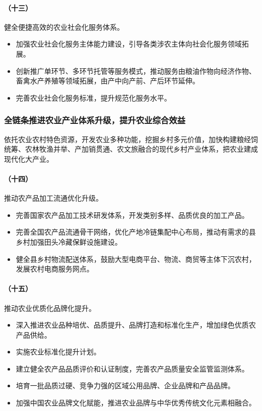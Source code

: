\paragraph{（十三）}健全便捷高效的农业社会化服务体系。

\begin{itemize}
    \item 加强农业社会化服务主体能力建设，引导各类涉农主体向社会化服务领域拓展。
    \item 创新推广单环节、多环节托管等服务模式，推动服务由粮油作物向经济作物、畜禽水产养殖等领域拓展，由产中向产前、产后环节延伸。
    \item 完善农业社会化服务标准，提升规范化服务水平。
\end{itemize}

\subsubsection{全链条推进农业产业体系升级，提升农业综合效益}

依托农业农村特色资源，开发农业多种功能，挖掘乡村多元价值，加快构建粮经饲统筹、农林牧渔并举、产加销贯通、农文旅融合的现代乡村产业体系，把农业建成现代化大产业。

\paragraph{（十四）}推动农产品加工流通优化升级。

\begin{itemize}
    \item 完善国家农产品加工技术研发体系，开发类别多样、品质优良的加工产品。
    \item 完善全国农产品流通骨干网络，优化产地冷链集配中心布局，推动有需求的县乡村加强田头冷藏保鲜设施建设。
    \item 健全县乡村物流配送体系，鼓励大型电商平台、物流、商贸等主体下沉农村，发展农村电商服务网点。
\end{itemize}

\paragraph{（十五）}推动农业优质化品牌化提升。

\begin{itemize}
    \item 深入推进农业品种培优、品质提升、品牌打造和标准化生产，增加绿色优质农产品供给。
    \item 实施农业标准化提升计划。
    \item 建立健全农产品品质评价和认证制度，完善农产品质量安全监管监测体系。
    \item 培育一批品质过硬、竞争力强的区域公用品牌、企业品牌和产品品牌。
    \item 加强中国农业品牌文化赋能，推进农业品牌与中华优秀传统文化元素相融合。
\end{itemize}


